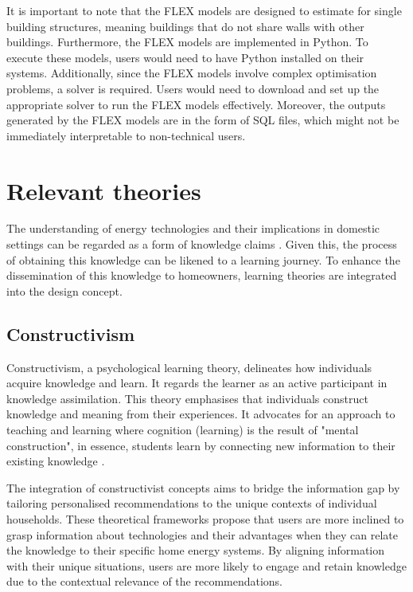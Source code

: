 It is important to note that the FLEX models are designed to estimate for single building structures, meaning buildings that do not share walls with other buildings. 
Furthermore, the FLEX models are implemented in Python. 
To execute these models, users would need to have Python installed on their systems. 
Additionally, since the FLEX models involve complex optimisation problems, a solver is required. 
Users would need to download and set up the appropriate solver to run the FLEX models effectively.
Moreover, the outputs generated by the FLEX models are in the form of SQL files, 
which might not be immediately interpretable to non-technical users.


\section{Relevant theories}

The understanding of energy technologies and their implications in domestic settings can be regarded as a form of knowledge claims \cite{Bolisani2018}.
Given this, the process of obtaining this knowledge can be likened to a learning journey.
To enhance the dissemination of this knowledge to homeowners, learning theories are integrated into the design concept.


\subsection{Constructivism}

Constructivism, a psychological learning theory, delineates how individuals acquire knowledge and learn. 
It regards the learner as an active participant in knowledge assimilation.
This theory emphasises that individuals construct knowledge and meaning from their experiences. 
It advocates for an approach to teaching and learning where cognition (learning) is the result of "mental construction",
in essence, students learn by connecting new information to their existing knowledge \cite{Bada2015}. 

The integration of constructivist concepts aims to bridge the information gap by tailoring personalised recommendations to the unique contexts of individual households.
These theoretical frameworks propose that users are more inclined to grasp information about technologies and their advantages when they can relate the knowledge to their specific home energy systems.
By aligning information with their unique situations, users are more likely to engage and retain knowledge due to the contextual relevance of the recommendations.


